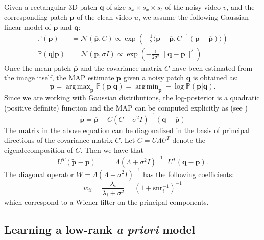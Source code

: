 \documentclass[10pt, journal, twocolumn, final, a4paper]{IEEEtran}
\newcommand{\ma}[1]{\boldsymbol{#1}}
\DeclareMathOperator*{\argmin}{arg\,min}
\DeclareMathOperator*{\argmax}{arg\,max}
\begin{document}
Given a rectangular 3D patch $\ma q$ of size $s_x\times s_x\times s_t$ of the noisy video $v$, and the 
corresponding patch $\ma p$ of the clean video $u$, we assume the following 
Gaussian linear model of $\ma p$ and $\ma q$:
\begin{align}
	\mathds{P}(\ma p) &= \mathcal N(\overline {\ma p}, C) \propto \exp\left(-\frac12\langle \ma p - \overline{\ma p}, C^{-1}(\ma p - \overline{\ma p})\rangle\right) \label{eq:prior}\\
	\mathds{P}(\ma q|\ma p) &= \mathcal N(\ma p, \sigma I) \propto \exp\left(-\frac1{2\sigma^2}\|\ma q - \ma p\|^2\right) \label{eq:obs}
\end{align}
Once the mean patch $\overline{\ma p}$ and the
covariance matrix $C$ have been estimated from the image itself, the MAP
estimate $\widetilde{\ma p}$ given a noisy patch $\ma q$ is obtained as:
\[ \widetilde{\ma p} = \argmax_{\ma p} \mathds P(\ma p | \ma q) = \argmin_{\ma p} -\log \mathds P(\ma p | \ma q). \]
Since we are working with Gaussian distributions, the log-posterior is a quadratic (positive definite)
function and the MAP can be computed explicitly as (see  \cite{Lebrun2013a})
\begin{equation}
	\widetilde{\ma p} = \overline{\ma p} + C(C + \sigma^2 I)^{-1}(\ma q - \overline{\ma p})
	\label{eq:map}
\end{equation}
The matrix in the above equation can be diagonalized in the basis of
principal directions of the covariance matrix $C$.
Let $C = U\Lambda U^T$ denote the eigendecomposition of $C$. Then we have that
\[U^T(\widetilde{\ma p} - \overline{\ma p}) \,\,\,\, = \,\,\,\, 
	\Lambda(\Lambda + \sigma^2 I)^{-1}\,\,\,\,
	U^T (\ma q - \overline{\ma p}).\]
The diagonal operator $W = \Lambda(\Lambda + \sigma^2I)^{-1}$
has the following coefficients:
\begin{equation}
w_{ii} = \frac{\lambda_i}{\lambda_i + \sigma^2}
				 = (1 + \text{snr}_i^{-1})^{-1}
				 \label{eq:wiener_coeffs}
\end{equation}
which correspond to a Wiener filter on the principal components.

%

\subsection{Learning a low-rank \textit{a priori} model}
\end{document}
